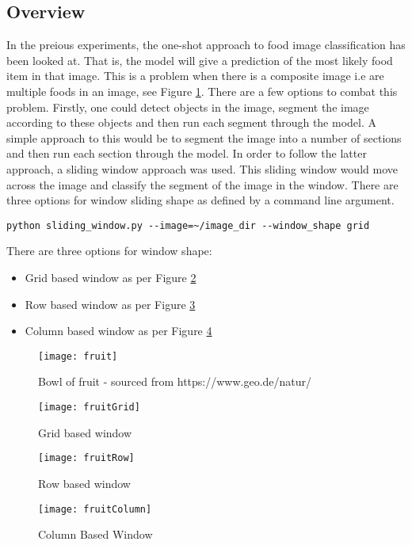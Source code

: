 \subsection*{Overview}
In the preious experiments, the one-shot approach to food image
classification has been looked at. That is, the model will give a prediction of the most likely
food item in that image. This is a problem when there is a composite image i.e are multiple foods in an
image, see Figure \ref{fig:fruit}. There are a few options to combat this problem. Firstly, one could detect
objects in the image, segment the image according to these objects and then run
each segment through the model. A simple approach to this would be to segment
the image into a number of sections and then run each section through the model.
In order to follow the latter approach, a sliding window approach was used. This
sliding window would move across the image and classify the segment of the image
in the window. There are three options for window sliding shape as defined by a
command line argument.

\begin{lstlisting}
python sliding_window.py --image=~/image_dir --window_shape grid
\end{lstlisting}

There are three options for window shape:
\begin{itemize}
	\item{Grid based window as per Figure \ref{fig:fruitGrid}}
	\item{Row based window as per Figure \ref{fig:fruitRow}}
	\item{Column based window as per Figure \ref{fig:fruitColumn}}
\end{itemize}

\begin{figure}
    \texttt{[image: fruit]}
    \caption{Bowl of fruit - sourced from https://www.geo.de/natur/}
    \label{fig:fruit}
\end{figure}

\begin{figure}
    \texttt{[image: fruitGrid]}
	\caption{Grid based window}
    \label{fig:fruitGrid}
\end{figure}

\begin{figure}
    \texttt{[image: fruitRow]}
    \caption{Row based window}
    \label{fig:fruitRow}
\end{figure}

\begin{figure}
    \texttt{[image: fruitColumn]}
    \caption{Column Based Window}
    \label{fig:fruitColumn}
\end{figure}

